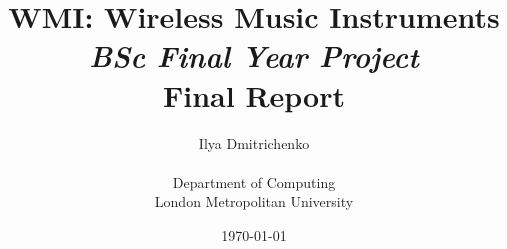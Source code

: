 

\newcommand{\Chip}[1]{\emph{\texttt{#1}}}
\newcommand{\MCX}[0]{\Chip{MC1322x}}
\newcommand{\RFA}[0]{\Chip{ATmega128RFA1}}
\newcommand{\Port}[1]{\emph{\texttt{Port #1}}}
\newcommand{\Comp}[1]{\emph{\texttt{#1}}}
\newcommand{\WPAN}[0]{\emph{LR-WPAN}}
\newcommand{\Tracker}[0]{\subsubsection{\emph{Tracked Issues}}\begin{description}}

\newcommand{\Issue}[1]{\href{http://wmi.new-synth.info/issues/#1}{Issue \##1}}

\newcommand{\IssueX}[1]{\item[\href{http://wmi.new-synth.info/issues/#1}{\Issue{#1}}]:}

\newcommand{\TEP}[1]{\emph{\href{http://www.tinyos.net/tinyos-2.x/doc/pdf/tep#1.pdf}{TEP#1}}}

\newcommand{\Contiki}[0]{\emph{Contiki}}
\newcommand{\ContikiOS}[0]{\emph{Contiki OS}}
\newcommand{\TinyOS}[0]{\emph{TinyOS}}


\documentclass[a4paper]{report}

\usepackage{multirow}
\usepackage{graphicx}

\usepackage{hyperref} \newcommand{\URL}[1]{\[ \href{#1}{\texttt{\emph{#1}}} \]}




\title{WMI: Wireless Music Instruments\\ \emph{BSc Final Year Project} \\ Final Report}
\author{Ilya Dmitrichenko \\ \\ Department of Computing\\ London Metropolitan University}

\date{\today}




